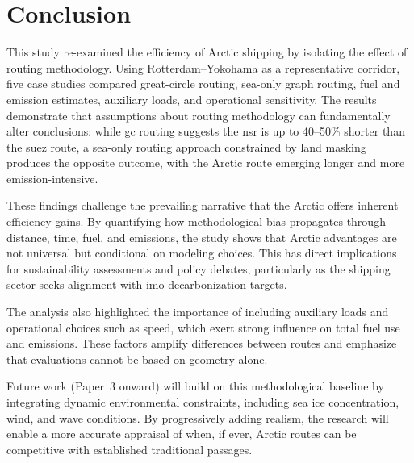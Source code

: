 \section{Conclusion}\label{sec:conclusion}

This study re-examined the efficiency of Arctic shipping by isolating the effect of routing methodology. Using Rotterdam--Yokohama as a representative corridor, five case studies compared great-circle routing, sea-only graph routing, fuel and emission estimates, auxiliary loads, and operational sensitivity. The results demonstrate that assumptions about routing methodology can fundamentally alter conclusions: while \ac{gc} routing suggests the \ac{nsr} is up to 40--50\% shorter than the \ac{suez} route, a sea-only routing approach constrained by land masking produces the opposite outcome, with the Arctic route emerging longer and more emission-intensive.

These findings challenge the prevailing narrative that the Arctic offers inherent efficiency gains. By quantifying how methodological bias propagates through distance, time, fuel, and emissions, the study shows that Arctic advantages are not universal but conditional on modeling choices. This has direct implications for sustainability assessments and policy debates, particularly as the shipping sector seeks alignment with \ac{imo} decarbonization targets.

The analysis also highlighted the importance of including auxiliary loads and operational choices such as speed, which exert strong influence on total fuel use and emissions. These factors amplify differences between routes and emphasize that evaluations cannot be based on geometry alone. 

Future work (Paper~3 onward) will build on this methodological baseline by integrating dynamic environmental constraints, including sea ice concentration, wind, and wave conditions. By progressively adding realism, the research will enable a more accurate appraisal of when, if ever, Arctic routes can be competitive with established traditional passages.
